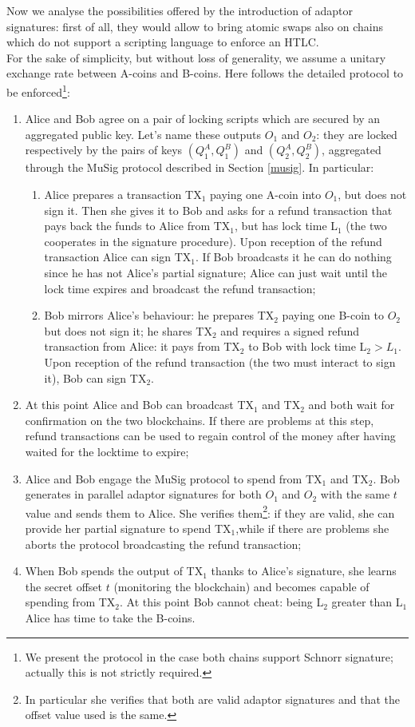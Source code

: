 \bigskip
\noindent
Now we analyse the possibilities offered by the introduction of adaptor signatures: first of all, they would allow to bring atomic swaps also on chains which do not support a scripting language to enforce an HTLC. 
\\
For the sake of simplicity, but without loss of generality, we assume a unitary exchange rate between A-coins and B-coins. Here follows the detailed protocol to be enforced\footnote{We present the protocol in the case both chains support Schnorr signature; actually this is not strictly required.}:
\begin{enumerate}
	\item Alice and Bob agree on a pair of locking scripts which are secured by an aggregated public key. Let's name these outputs $O_1$ and $O_2$: they are locked respectively by the pairs of keys $(Q_1^A, Q_1^B)$ and $(Q_2^A, Q_2^B)$, aggregated through the MuSig protocol described in Section \ref{musig}. In particular:
	\begin{enumerate}
		\item Alice prepares a transaction TX$_1$ paying one A-coin into $O_1$, but does not sign it. Then she gives it to Bob and asks for a refund transaction that pays back the funds to Alice from TX$_1$, but has lock time L$_1$ (the two cooperates in the signature procedure). Upon reception of the refund transaction Alice can sign TX$_1$. If Bob broadcasts it he can do nothing since he has not Alice's partial signature; Alice can just wait until the lock time expires and broadcast the refund transaction;
		\item Bob mirrors Alice's behaviour: he prepares TX$_2$ paying one B-coin to $O_2$ but does not sign it; he shares TX$_2$ and requires a signed refund transaction from Alice: it pays from TX$_2$ to Bob with lock time L$_2 > L_1$. Upon reception of the refund transaction (the two must interact to sign it), Bob can sign TX$_2$.
	\end{enumerate}
	\item At this point Alice and Bob can broadcast TX$_1$ and TX$_2$ and both wait for confirmation on the two blockchains. If there are problems at this step, refund transactions can be used to regain control of the money after having waited for the locktime to expire;
	\item Alice and Bob engage the MuSig protocol to spend from TX$_1$ and TX$_2$. Bob generates in parallel adaptor signatures for both $O_1$ and $O_2$ with the same $t$ value and sends them to Alice. She verifies them\footnote{In particular she verifies that both are valid adaptor signatures and that the offset value used is the same.}: if they are valid, she can provide her partial signature to spend TX$_1$,while if there are problems she aborts the protocol broadcasting the refund transaction;
	\item When Bob spends the output of TX$_1$ thanks to Alice's signature, she learns the secret offset $t$ (monitoring the blockchain) and becomes capable of spending from TX$_2$. At this point Bob cannot cheat: being L$_2$ greater than L$_1$ Alice has time to take the B-coins.
\end{enumerate}
